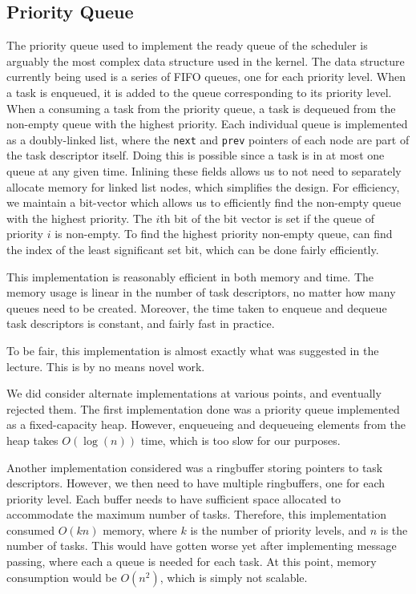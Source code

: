 \documentclass[titlepage]{article}
\begin{document}
\subsection{Priority Queue}
The priority queue used to implement the ready queue of the scheduler is
arguably the most complex data structure used in the kernel.
The data structure currently being used is a series of FIFO queues, one for
each priority level.
When a task is enqueued, it is added to the queue corresponding to its priority
level.
When a consuming a task from the priority queue, a task is dequeued from the
non-empty queue with the highest priority.
Each individual queue is implemented as a doubly-linked list, where the
\texttt{next} and \texttt{prev} pointers of each node are part of the task
descriptor itself.
Doing this is possible since a task is in at most one queue at any given time.
Inlining these fields allows us to not need to separately allocate memory for
linked list nodes, which simplifies the design.
For efficiency, we maintain a bit-vector which allows us to efficiently find
the non-empty queue with the highest priority.
The $i$th bit of the bit vector is set if the queue of priority $i$ is non-empty.
To find the highest priority non-empty queue, can find the index of the least
significant set bit, which can be done fairly efficiently.

This implementation is reasonably efficient in both memory and time.
The memory usage is linear in the number of task descriptors, no matter
how many queues need to be created.
Moreover, the time taken to enqueue and dequeue task descriptors is constant,
and fairly fast in practice.

To be fair, this implementation is almost exactly what was suggested in the lecture.
This is by no means novel work.

We did consider alternate implementations at various points, and eventually rejected them.
The first implementation done was a priority queue implemented as a fixed-capacity heap.
However, enqueueing and dequeueing elements from the heap takes $O(\log(n))$ time,
which is too slow for our purposes.

Another implementation considered was a ringbuffer storing pointers to task descriptors.
However, we then need to have multiple ringbuffers, one for each priority level.
Each buffer needs to have sufficient space allocated to accommodate the maximum
number of tasks.
Therefore, this implementation consumed $O(kn)$ memory, where $k$ is the number
of priority levels, and $n$ is the number of tasks.
This would have gotten worse yet after implementing message passing, where each
a queue is needed for each task.
At this point, memory consumption would be $O(n^2)$, which is simply not scalable.
\end{document}
